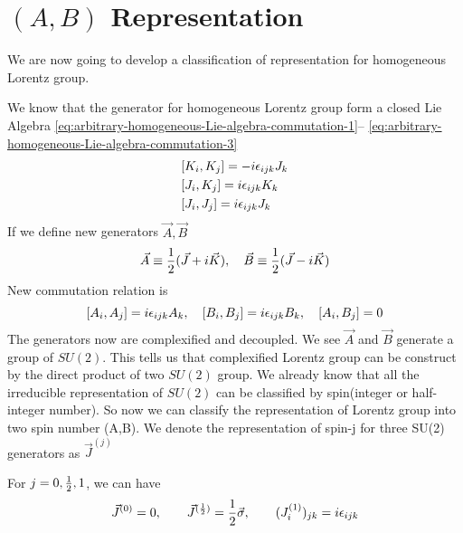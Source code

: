 \section{$(A,B)$ Representation}

We are now going to develop a classification of representation for homogeneous Lorentz group.



We know that the generator for homogeneous Lorentz group form a closed Lie Algebra \eqref{eq:arbitrary-homogeneous-Lie-algebra-commutation-1}-- \eqref{eq:arbitrary-homogeneous-Lie-algebra-commutation-3}
\begin{align}
&[K_i,K_j] = -i \epsilon_{ijk} J_k
\\
&[J_i,K_j] = i \epsilon_{ijk} K_k
\\
&[J_i,J_j] = i \epsilon_{ijk} J_k
\end{align}
If we define new generators $\vec{A}, \vec{B}$
\begin{equation}\label{definition of A and B}
  \vec{A} \equiv \frac{1}{2}(\vec{J}+i\vec{K}),\quad
\vec{B} \equiv \frac{1}{2}(\vec{J}-i\vec{K})
\end{equation}
New commutation relation is
\begin{equation} \label{commutation relation of A and B}
\comm{A_i}{A_j} = i \e_{ijk} A_k,\quad
\comm{B_i}{B_j} = i \e_{ijk} B_k,\quad
\comm{A_i}{B_j} = 0
\end{equation}
The generators now are complexified and decoupled. We see $\vec{A}$ and $\vec{B}$ generate a group of $SU(2)$. This tells us that complexified Lorentz group can be construct by the direct product of two $SU(2)$ group. We already know that all the irreducible representation of $SU(2)$ can be classified by spin(integer or half-integer number). So now we can classify the representation of Lorentz group into two spin number (A,B). We denote the representation of spin-j for three SU(2) generators as $\vec{J}^{(j)}$

For $j = 0 , \frac{1}{2} , 1$, we can have 
\begin{equation}\label{spin representation matrice for j = 0,1/2,1}
\vec{J}^{(0)} = 0, \qquad
\vec{J}^{(\frac{1}{2})} = \frac{1}{2} \vec{\sigma},\qquad
(J^{(1)}_i)_{jk} = i\epsilon_{ijk}
\end{equation}
 

